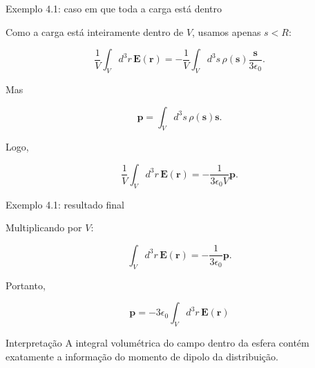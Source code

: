 \documentclass[aspectratio=169]{beamer}
\begin{document}
\begin{frame}{Exemplo 4.1: caso em que toda a carga está dentro}

Como a carga está inteiramente dentro de \(V\), usamos apenas \(s<R\):

\begin{eqbox}
\begin{equation}
\frac{1}{V}
\int_V d^3r\,\mathbf E(\mathbf r)
=
-
\frac{1}{V}
\int_V d^3s\,\rho(\mathbf s)
\frac{\mathbf s}{3\epsilon_0}.
\label{eq:resultado_intermediario_exemplo}
\end{equation}
\end{eqbox}

Mas

\begin{eqbox}
\begin{equation}
\mathbf p
=
\int_V d^3s\,\rho(\mathbf s)\mathbf s.
\label{eq:p_exemplo}
\end{equation}
\end{eqbox}

Logo,

\begin{eqbox}
\begin{equation}
\frac{1}{V}
\int_V d^3r\,\mathbf E(\mathbf r)
=
-\frac{1}{3\epsilon_0 V}\mathbf p.
\label{eq:media_exemplo_final}
\end{equation}
\end{eqbox}

\end{frame}

\begin{frame}{Exemplo 4.1: resultado final}

Multiplicando por \(V\):

\begin{eqbox}
\begin{equation}
\int_V d^3r\,\mathbf E(\mathbf r)
=
-\frac{1}{3\epsilon_0}\mathbf p.
\label{eq:int_campo_exemplo}
\end{equation}
\end{eqbox}

Portanto,

\begin{eqbox}
\begin{equation}
\boxed{
\mathbf p
=
-3\epsilon_0
\int_V d^3r\,\mathbf E(\mathbf r)
}
\label{eq:resultado_exemplo_41}
\end{equation}
\end{eqbox}

\begin{mybox}{Interpretação}
A integral volumétrica do campo dentro da esfera contém exatamente a informação do momento de dipolo da distribuição.
\end{mybox}


\end{frame}
\end{document}
